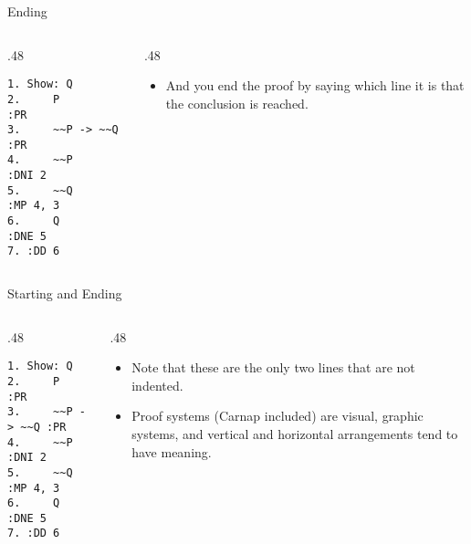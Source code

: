 \documentclass[
  ignorenonframetext,
]{beamer}
\providecommand{\tightlist}{%
  \setlength{\itemsep}{0pt}\setlength{\parskip}{0pt}}
\renewcommand{\,}{\text{, }}
\def\begincols{\begin{columns}}
\def\begincol{\begin{column}}
\def\endcol{\end{column}}
\def\endcols{\end{columns}}
\begin{document}
\begin{frame}[fragile]{Ending}
\protect\hypertarget{ending}{}

\begincols
\begincol{.48\textwidth}

\begin{verbatim}
1. Show: Q
2.     P          :PR
3.     ~~P -> ~~Q :PR
4.     ~~P        :DNI 2
5.     ~~Q        :MP 4, 3
6.     Q          :DNE 5
7. :DD 6
\end{verbatim}

\endcol
\begincol{.48\textwidth}

\begin{itemize}
\tightlist
\item
  And you end the proof by saying which line it is that the conclusion
  is reached.
\end{itemize}

\endcol
\endcols

\end{frame}

\begin{frame}[fragile]{Starting and Ending}
\protect\hypertarget{starting-and-ending-1}{}

\begincols
\begincol{.48\textwidth}

\begin{verbatim}
1. Show: Q
2.     P          :PR
3.     ~~P -> ~~Q :PR
4.     ~~P        :DNI 2
5.     ~~Q        :MP 4, 3
6.     Q          :DNE 5
7. :DD 6
\end{verbatim}

\endcol
\begincol{.48\textwidth}

\begin{itemize}
\tightlist
\item
  Note that these are the only two lines that are not indented.
\item
  Proof systems (Carnap included) are visual, graphic systems, and
  vertical and horizontal arrangements tend to have meaning.
\end{itemize}

\endcol
\endcols

\end{frame}
\end{document}
